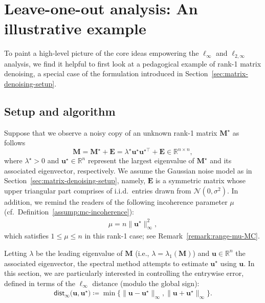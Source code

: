 
\section{Leave-one-out analysis: An illustrative example}
\label{sec:rank-1-denoising-LOO}



To paint a high-level picture of the core ideas empowering the $\ell_{\infty}$ and $\ell_{2,\infty}$ analysis, we find it helpful to first look at a pedagogical example of rank-1 matrix denoising, a special case of the formulation introduced in Section~\ref{sec:matrix-denoising-setup}.


\subsection{Setup and algorithm}
\label{sec:setup-rank1-denoising}
Suppose that we observe a noisy copy of an unknown rank-1 matrix $\bm{M}^{\star}$ as follows
%
\begin{equation}
	\bm{M}=\bm{M}^{\star}+\bm{E}=\lambda^{\star}\bm{u}^{\star}\bm{u}^{\star\top}+\bm{E} \in \mathbb{R}^{n\times n},
	\label{eq:defn-matrix-denoising-rank1}
\end{equation}
%
where $\lambda^{\star}>0$ and $\bm{u}^{\star}\in \mathbb{R}^{n}$
represent the largest eigenvalue  of $\bm{M}^{\star}$ and its associated eigenvector, respectively.  We assume the Gaussian noise model as in Section~\ref{sec:matrix-denoising-setup}, namely, $\bm{E}$ is a symmetric matrix whose upper triangular part comprises of i.i.d.~entries drawn from $\mathcal{N}(0,\sigma^2)$.
 In addition, we remind the readers of the following incoherence parameter $\mu$  (cf.~Definition~\ref{assump:mc-incoherence}):
%
\begin{align}
	\mu = n\|\bm{u}^{\star}\|_{\infty}^{2},
	\label{defn:incoherence-rank-1-denoising}
\end{align}
%
which satisfies $1 \leq \mu \leq n$ in this rank-1 case; see Remark~\ref{remark:range-mu-MC}.



Letting $\lambda$  be the leading eigenvalue of $\bm{M}$ (i.e., $\lambda = \lambda_{1}(\bm{M})$) and $\bm{u}\in \mathbb{R}^{n}$
 the associated eigenvector, the spectral method attempts to estimate $\bm{u}^{\star}$ using $\bm{u}$. In this section, we are particularly interested in controlling the entrywise error, defined in terms of the $\ell_{\infty}$ distance (modulo the global sign):
 \begin{align}
	\mathsf{dist}_{\infty}\big(\bm{u},\bm{u}^{\star}\big)
	\coloneqq \min\big\{ \|\bm{u}-\bm{u}^{\star}\|_{\infty}, \|\bm{u}+\bm{u}^{\star}\|_{\infty} \big\}.
	\label{eq:defn-dist-infty-vector}
\end{align}




